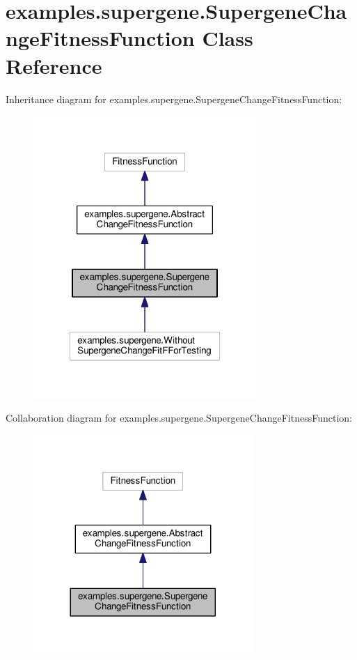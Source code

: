 \hypertarget{classexamples_1_1supergene_1_1_supergene_change_fitness_function}{\section{examples.\-supergene.\-Supergene\-Change\-Fitness\-Function Class Reference}
\label{classexamples_1_1supergene_1_1_supergene_change_fitness_function}
}


Inheritance diagram for examples.\-supergene.\-Supergene\-Change\-Fitness\-Function\-:
\nopagebreak
\begin{figure}[H]
\begin{center}
\leavevmode
\includegraphics[width=240pt]{classexamples_1_1supergene_1_1_supergene_change_fitness_function__inherit__graph}
\end{center}
\end{figure}


Collaboration diagram for examples.\-supergene.\-Supergene\-Change\-Fitness\-Function\-:
\nopagebreak
\begin{figure}[H]
\begin{center}
\leavevmode
\includegraphics[width=236pt]{classexamples_1_1supergene_1_1_supergene_change_fitness_function__coll__graph}
\end{center}
\end{figure}
